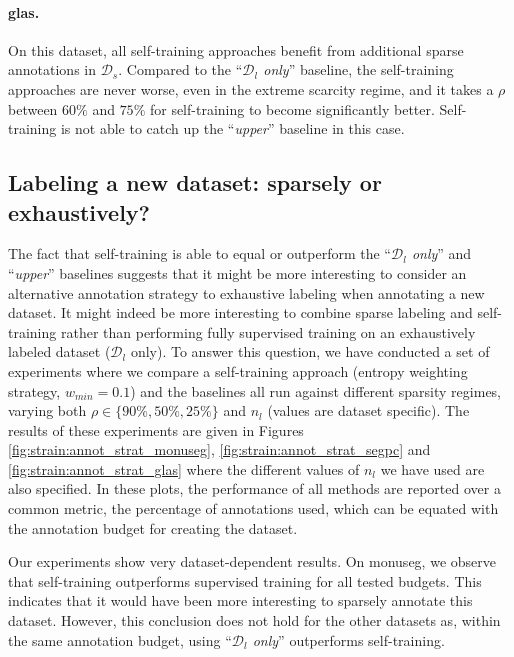 \paragraph{\acrshort{glas}.} On this dataset, all self-training approaches benefit from additional sparse annotations in $\mathcal{D}_s$. Compared to the ``\textit{$\mathcal{D}_l$ only}'' baseline, the self-training approaches are never worse, even in the extreme scarcity regime, and it takes a $\rho$ between $60\%$ and $75\%$ for self-training to become significantly better. Self-training is not able to catch up the ``\textit{upper}'' baseline in this case. 

\subsection{Labeling a new dataset: sparsely or exhaustively?}
\label{ssec:strain:sparsevsexhaustive}

The fact that self-training is able to equal or outperform the ``\textit{$\mathcal{D}_l$ only}'' and ``\textit{upper}'' baselines suggests that it might be more interesting to consider an alternative annotation strategy to exhaustive labeling when annotating a new dataset. %
It might indeed be more interesting to combine sparse labeling and self-training rather than performing fully supervised training on an exhaustively labeled dataset (\ie $\mathcal{D}_l$ only). To answer this question, we have conducted a set of experiments where we compare a self-training approach (entropy weighting strategy, $w_{min} = 0.1$) and the baselines all run against different sparsity regimes, varying both $\rho \in \{90\%, 50\%, 25\%\}$ and $n_l$ (values are dataset specific). The results of these experiments are given in Figures \ref{fig:strain:annot_strat_monuseg}, \ref{fig:strain:annot_strat_segpc} and \ref{fig:strain:annot_strat_glas} where the different values of $n_l$ we have used are also specified. In these plots, the performance of all methods are reported over a common metric, the percentage of annotations used, which can be equated with the annotation budget for creating the dataset.

Our experiments show very dataset-dependent results. On \acrshort{monuseg}, we observe that self-training outperforms supervised training for all tested budgets. This indicates that it would have been more interesting to sparsely annotate this dataset. However, this conclusion does not hold for the other datasets as, within the same annotation budget, using ``\textit{$\mathcal{D}_l$ only}'' outperforms self-training.

